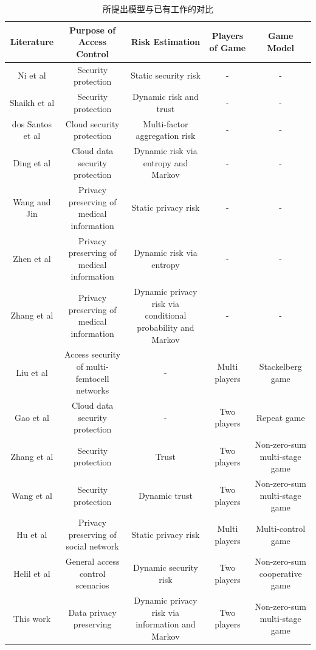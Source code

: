 \begin{table}[htb]
	
	\caption{所提出模型与已有工作的对比}\label{tab:comparison}
	\centering 
	\tiny
	\begin{tabular}{ccccc}
		\toprule
		Literature & Purpose of Access Control & Risk Estimation & Players of Game & Game Model \\
		\hline
		Ni et al\cite{ni2010risk} & Security protection &Static security risk&-&-\\ 
		Shaikh et al\cite{shaikh2012dynamic} & Security protection & Dynamic risk and trust &-&-\\
		dos Santos et al\cite{santos2016} &Cloud security protection & Multi-factor aggregation risk &-&-\\
		Ding et al\cite{ding2019} & Cloud  data security protection& Dynamic risk via entropy and Markov & - & -\\
		Wang and Jin\cite{wang2011quantified} & Privacy preserving of medical information & Static privacy risk &-&-\\
		Zhen et al\cite{zhen2015} & Privacy preserving of medical information& Dynamic risk via entropy & - & -\\
		Zhang et al\cite{zhang2018privacy} & Privacy preserving of medical information& Dynamic privacy risk via conditional probability  and Markov &-&-\\
		Liu et al\cite{liu2016} & Access security of multi-femtocell networks&-&	Multi players&	Stackelberg game\\
		Gao et al\cite{gao2018} & Cloud  data security protection& -&	Two players &Repeat game\\
		Zhang et al\cite{zhang2015} & Security protection& Trust & Two players & Non-zero-sum multi-stage game\\
		Wang et al\cite{wang2019} & Security protection& Dynamic trust & Two players & Non-zero-sum multi-stage game\\
		Hu et al\cite{hu2014} & Privacy preserving of social network&Static privacy risk&Multi players&	Multi-control game\\
		Helil et al\cite{helil2017} & General access control scenarios&Dynamic security risk&Two players&Non-zero-sum cooperative game\\
		This work & Data privacy preserving& Dynamic privacy risk via information and Markov & Two players & Non-zero-sum multi-stage game\\
		\bottomrule 
	\end{tabular}
\end{table}



